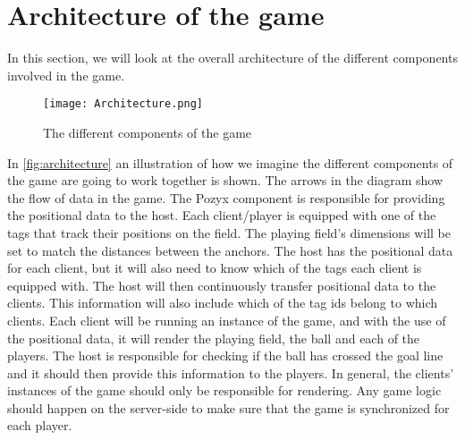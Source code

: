 \section{Architecture of the game}\label{sec:sprint1-architecture}
In this section, we will look at the overall architecture of the different components involved in the game.
\begin{figure}[H]
    \centering
    \texttt{[image: Architecture.png]}
    \caption{The different components of the game}
    \label{fig:architecture}
\end{figure}
\noindent
In \autoref{fig:architecture} an illustration of how we imagine the different components of the game are going to work together is shown.
The arrows in the diagram show the flow of data in the game.
The Pozyx component is responsible for providing the positional data to the host. 
Each client/player is equipped with one of the tags that track their positions on the field. 
The playing field's dimensions will be set to match the distances between the anchors. 
The host has the positional data for each client, but it will also need to know which of the tags each client is equipped with.
The host will then continuously transfer positional data to the clients.
This information will also include which of the tag ids belong to which clients.
Each client will be running an instance of the game, and with the use of the positional data, it will render the playing field, the ball and each of the players.
The host is responsible for checking if the ball has crossed the goal line and it should then provide this information to the players.
In general, the clients' instances of the game should only be responsible for rendering.
Any game logic should happen on the server-side to make sure that the game is synchronized for each player. 
